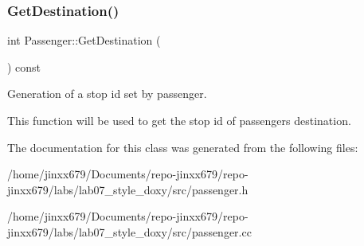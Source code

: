 \subsubsection{\texorpdfstring{Get\+Destination()}{GetDestination()}}
{\footnotesize\ttfamily int Passenger\+::\+Get\+Destination (\begin{DoxyParamCaption}{ }\end{DoxyParamCaption}) const}



Generation of a stop id set by passenger. 

This function will be used to get the stop id of passenger\textquotesingle{}s destination. 

The documentation for this class was generated from the following files\+:\begin{DoxyCompactItemize}
\item 
/home/jinxx679/\+Documents/repo-\/jinxx679/repo-\/jinxx679/labs/lab07\+\_\+style\+\_\+doxy/src/passenger.\+h\item 
/home/jinxx679/\+Documents/repo-\/jinxx679/repo-\/jinxx679/labs/lab07\+\_\+style\+\_\+doxy/src/passenger.\+cc\end{DoxyCompactItemize}
